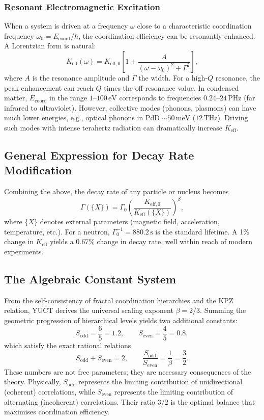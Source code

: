 \documentclass[12pt]{article}
\theoremstyle{remark}
\newcommand{\Keff}{K_{\mathrm{eff}}}
\newcommand{\Keffzero}{K_{\mathrm{eff},0}}
\newcommand{\Sodd}{S_{\mathrm{odd}}}
\newcommand{\Seven}{S_{\mathrm{even}}}
\begin{document}
	\subsubsection{Resonant Electromagnetic Excitation}
	
	When a system is driven at a frequency \(\omega\) close to a characteristic coordination frequency \(\omega_0 = E_{\mathrm{coord}}/\hbar\), the coordination efficiency can be resonantly enhanced. A Lorentzian form is natural:
	\begin{equation}
		\Keff(\omega) = \Keffzero \left[ 1 + \frac{A}{(\omega - \omega_0)^2 + \Gamma^2} \right],
		\label{eq:keff-omega}
	\end{equation}
	where \(A\) is the resonance amplitude and \(\Gamma\) the width. For a high‑\(Q\) resonance, the peak enhancement can reach \(Q\) times the off‑resonance value. In condensed matter, \(E_{\mathrm{coord}}\) in the range \(1\)–\(100\,\text{eV}\) corresponds to frequencies \(0.24\)–\(24\,\text{PHz}\) (far infrared to ultraviolet). However, collective modes (phonons, plasmons) can have much lower energies, e.g., optical phonons in PdD \(\sim 50\,\text{meV}\) (\(12\,\text{THz}\)). Driving such modes with intense terahertz radiation can dramatically increase \(\Keff\).
	
	\subsection{General Expression for Decay Rate Modification}
	
	Combining the above, the decay rate of any particle or nucleus becomes
	\begin{equation}
		\Gamma(\{X\}) = \Gamma_0 \left( \frac{\Keffzero}{\Keff(\{X\})} \right)^{\beta},
		\label{eq:general-rate}
	\end{equation}
	where \(\{X\}\) denotes external parameters (magnetic field, acceleration, temperature, etc.). For a neutron, \(\Gamma_0^{-1} = 880.2\,\text{s}\) is the standard lifetime. A 1\% change in \(\Keff\) yields a \(0.67\%\) change in decay rate, well within reach of modern experiments.
	
	\subsection{The Algebraic Constant System}
	\label{sec:algebraic}
	
	From the self‑consistency of fractal coordination hierarchies and the KPZ relation, YUCT derives the universal scaling exponent \(\beta = 2/3\). Summing the geometric progression of hierarchical levels yields two additional constants:
	\[
	\Sodd = \frac{6}{5}=1.2,\qquad \Seven = \frac{4}{5}=0.8,
	\]
	which satisfy the exact rational relations
	\[
	\Sodd + \Seven = 2,\qquad \frac{\Sodd}{\Seven} = \frac{1}{\beta} = \frac{3}{2}.
	\]
	These numbers are not free parameters; they are necessary consequences of the theory. Physically, \(\Sodd\) represents the limiting contribution of unidirectional (coherent) correlations, while \(\Seven\) represents the limiting contribution of alternating (incoherent) correlations. Their ratio \(3/2\) is the optimal balance that maximises coordination efficiency.
	
\end{document}
